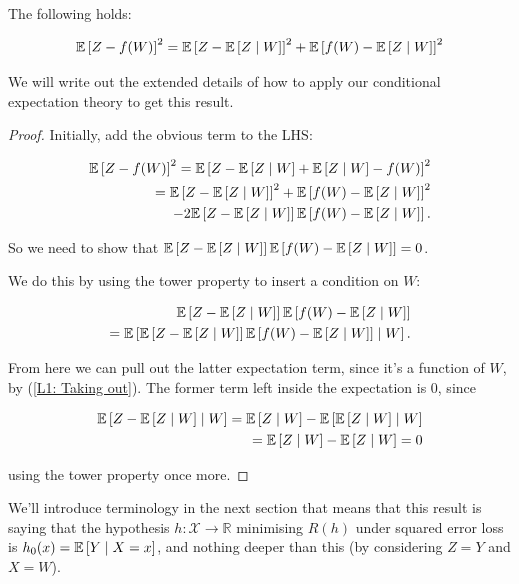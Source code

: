 \documentclass[11pt]{scrartcl}
\begin{document}
\begin{theorem}
\label{best least squares}

The following holds:

\begin{equation}
    \E{Z-f(W)}^2 = \E{Z - \E{Z \mid W}}^2 + \E{f(W)-\E{Z \mid W}}^2
\end{equation}

We will write out the extended details of how to apply our conditional expectation theory to get this result.

\begin{proof}
Initially, add the obvious term to the LHS:

\begin{align*}
    \E{Z-f(W)}^2 = \E{Z-\E{Z\mid W} + \E{Z\mid W} - f(W)}^2 \\
    = \E{Z - \E{Z \mid W}}^2 + \E{f(W)-\E{Z \mid W}}^2 \\
    - 2 \E{Z - \E{Z\mid W}} \E{f(W)-\E{Z\mid W}}.
\end{align*}

So we need to show that $\E{Z - \E{Z\mid W}} \E{f(W)-\E{Z\mid W}}=0$.

We do this by using the tower property to insert a condition on $W$:

\begin{align*}
    \E{Z - \E{Z\mid W}} \E{f(W)-\E{Z\mid W}} \\
    = \E{ \E{Z - \E{Z\mid W}} \E{f(W)-\E{Z\mid W}} \mid W}.
\end{align*}

From here we can pull out the latter expectation term, since it's a function of $W$, by (\ref{L1: Taking out}). The former term left inside the expectation is 0, since

\begin{align*}
    \E{Z - \E{Z \mid W} \mid W} = \E{Z \mid W} - \E{\E{Z \mid W} \mid W} \\
    = \E{Z \mid W} - \E{Z \mid W} = 0
\end{align*}

using the tower property once more.

\end{proof}
\end{theorem}

We'll introduce terminology in the next section that means that this result is saying that the hypothesis $h:\mathcal{X} \rightarrow \mathbb{R}$ minimising $R(h)$ under squared error loss is $h_0(x)=\E{Y \mid X = x}$, and nothing deeper than this (by considering $Z=Y$ and $X=W$).
\end{document}
